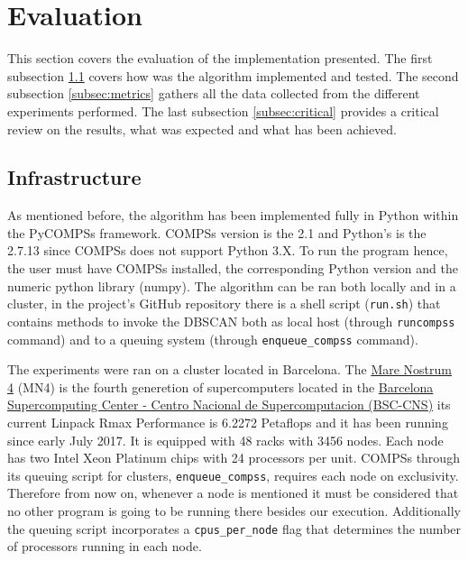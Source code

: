 \documentclass[10pt,journal,compsoc]{IEEEtran}
\begin{document}
\section{Evaluation} \label{sec:performance}


This section covers the evaluation of the implementation presented. The first subsection \ref{subsec:infrastructure} covers how was the algorithm implemented and tested. The second subsection \ref{subsec:metrics} gathers all the data collected from the different experiments performed. The last subsection \ref{subsec:critical} provides a critical review on the results, what was expected and what has been achieved.

\subsection{Infrastructure} \label{subsec:infrastructure}

As mentioned before, the algorithm has been implemented fully in Python within the PyCOMPSs framework. COMPSs version is the 2.1 and Python's is the 2.7.13 since COMPSs does not support Python 3.X. To run the program hence, the user must have COMPSs installed, the corresponding Python version and the numeric python library (numpy). The algorithm can be ran both locally and in a cluster, in the project's GitHub repository there is a shell script (\texttt{run.sh}) that contains methods to invoke the DBSCAN both as local host (through \texttt{runcompss} command) and to a queuing system (through \texttt{enqueue\_compss} command). 

The experiments were ran on a cluster located in Barcelona. The \href{https://www.bsc.es/user-support/mn4.php#systemoverview}{Mare Nostrum 4} (MN4) is the fourth generetion of supercomputers located in the \href{https://www.bsc.es}{Barcelona Supercomputing Center - Centro Nacional de Supercomputacion (BSC-CNS)} its current Linpack Rmax Performance is 6.2272 Petaflops and it has been running since early July 2017. It is equipped with 48 racks with 3456 nodes. Each node has two Intel Xeon Platinum chips with 24 processors per unit. COMPSs through its queuing script for clusters, \texttt{enqueue\_compss}, requires each node on exclusivity. Therefore from now on, whenever a node is mentioned it must be considered that no other program is going to be running there besides our execution. Additionally the queuing script incorporates a \texttt{cpus\_per\_node} flag that determines the number of processors running in each node.
\end{document}
